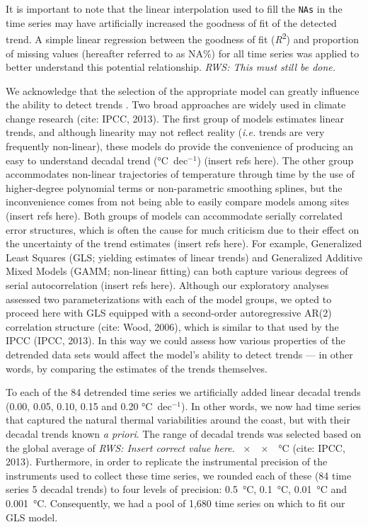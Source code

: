 \documentclass{ametsoc}
\begin{document}
It is important to note that the linear interpolation used to fill the \texttt{NAs} in the time series may have artificially increased the goodness of fit of the detected trend. A simple linear regression between the goodness of fit (\emph{R}\textsuperscript{2}) and proportion of missing values (hereafter referred to as NA\%) for all time series was applied to better understand this potential relationship. \emph{RWS: This must still be done.}

We acknowledge that the selection of the appropriate model can greatly influence the ability to detect trends \citet{Franzke2012}. Two broad approaches are widely used in climate change research (cite: IPCC, 2013). The first group of models estimates linear trends, and although linearity may not reflect reality (\emph{i.e.} trends are very frequently non-linear), these models do provide the convenience of producing an easy to understand decadal trend (\si{\degreeCelsius}~dec$^{-1}$) (insert refs here). The other group accommodates non-linear trajectories of temperature through time by the use of higher-degree polynomial terms or non-parametric smoothing splines, but the inconvenience comes from not being able to easily compare models among sites (insert refs here). Both groups of models can accommodate serially correlated error structures, which is often the cause for much criticism due to their effect on the uncertainty of the trend estimates (insert refs here). For example, Generalized Least Squares (GLS; yielding estimates of linear trends) and Generalized Additive Mixed Models (GAMM; non-linear fitting) can both capture various degrees of serial autocorrelation (insert refs here). Although our exploratory analyses assessed two parameterizations with each of the model groups, we opted to proceed here with GLS equipped with a second-order autoregressive AR(2) correlation structure (cite: Wood, 2006), which is similar to that used by the IPCC (IPCC, 2013). In this way we could assess how various properties of the detrended data sets would affect the model’s ability to detect trends --- in other words, by comparing the estimates of the trends themselves.

To each of the 84 detrended time series we artificially added linear decadal trends (0.00, 0.05, 0.10, 0.15 and 0.20 \si{\degreeCelsius}~dec$^{-1}$). In other words, we now had time series that captured the natural thermal variabilities around the coast, but with their decadal trends known \emph{a priori}. The range of decadal trends was selected based on the global average of \emph{RWS: Insert correct value here.} \SI{xx}{\degreeCelsius} (cite: IPCC, 2013). Furthermore, in order to replicate the instrumental precision of the instruments used to collect these time series, we rounded each of these (84 time series \texttimes{} 5 decadal trends) to four levels of precision: \SI{0.5}{\degreeCelsius}, \SI{0.1}{\degreeCelsius}, \SI{0.01}{\degreeCelsius} and \SI{0.001}{\degreeCelsius}. Consequently, we had a pool of 1,680 time series on which to fit our GLS model.
\end{document}
